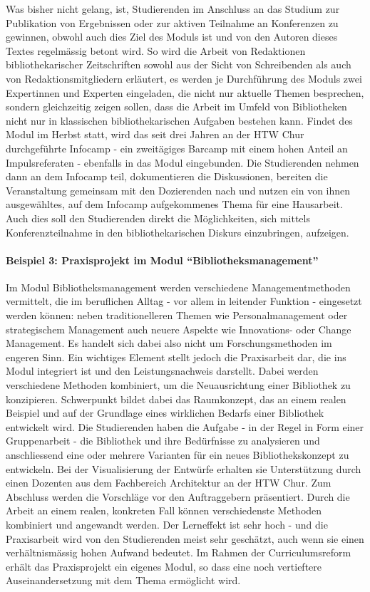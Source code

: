 \documentclass[a4paper,
fontsize=11pt,
oneside,
numbers=noperiodatend,
parskip=half-,
bibliography=totoc,
final
]{scrartcl}
\begin{document}
Was bisher nicht gelang, ist, Studierenden im Anschluss an das Studium
zur Publikation von Ergebnissen oder zur aktiven Teilnahme an
Konferenzen zu gewinnen, obwohl auch dies Ziel des Moduls ist und von
den Autoren dieses Textes regelmässig betont wird. So wird die Arbeit
von Redaktionen bibliothekarischer Zeitschriften sowohl aus der Sicht
von Schreibenden als auch von Redaktionsmitgliedern erläutert, es werden
je Durchführung des Moduls zwei Expertinnen und Experten eingeladen, die
nicht nur aktuelle Themen besprechen, sondern gleichzeitig zeigen
sollen, dass die Arbeit im Umfeld von Bibliotheken nicht nur in
klassischen bibliothekarischen Aufgaben bestehen kann. Findet des Modul
im Herbst statt, wird das seit drei Jahren an der HTW Chur durchgeführte
Infocamp - ein zweitägiges Barcamp mit einem hohen Anteil an
Impulsreferaten - ebenfalls in das Modul eingebunden. Die Studierenden
nehmen dann an dem Infocamp teil, dokumentieren die Diskussionen,
bereiten die Veranstaltung gemeinsam mit den Dozierenden nach und nutzen
ein von ihnen ausgewähltes, auf dem Infocamp aufgekommenes Thema für
eine Hausarbeit. Auch dies soll den Studierenden direkt die
Möglichkeiten, sich mittels Konferenzteilnahme in den bibliothekarischen
Diskurs einzubringen, aufzeigen.

\paragraph{Beispiel 3: Praxisprojekt im Modul
\enquote{Bibliotheksmanagement}}\label{beispiel-3-praxisprojekt-im-modul-bibliotheksmanagement}

Im Modul Bibliotheksmanagement werden verschiedene Managementmethoden
vermittelt, die im beruflichen Alltag - vor allem in leitender Funktion
- eingesetzt werden können: neben traditionelleren Themen wie
Personalmanagement oder strategischem Management auch neuere Aspekte wie
Innovations- oder Change Management. Es handelt sich dabei also nicht um
Forschungsmethoden im engeren Sinn. Ein wichtiges Element stellt jedoch
die Praxisarbeit dar, die ins Modul integriert ist und den
Leistungsnachweis darstellt. Dabei werden verschiedene Methoden
kombiniert, um die Neuausrichtung einer Bibliothek zu konzipieren.
Schwerpunkt bildet dabei das Raumkonzept, das an einem realen Beispiel
und auf der Grundlage eines wirklichen Bedarfs einer Bibliothek
entwickelt wird. Die Studierenden haben die Aufgabe - in der Regel in
Form einer Gruppenarbeit - die Bibliothek und ihre Bedürfnisse zu
analysieren und anschliessend eine oder mehrere Varianten für ein neues
Bibliothekskonzept zu entwickeln. Bei der Visualisierung der Entwürfe
erhalten sie Unterstützung durch einen Dozenten aus dem Fachbereich
Architektur an der HTW Chur. Zum Abschluss werden die Vorschläge vor den
Auftraggebern präsentiert. Durch die Arbeit an einem realen, konkreten
Fall können verschiedenste Methoden kombiniert und angewandt werden. Der
Lerneffekt ist sehr hoch - und die Praxisarbeit wird von den
Studierenden meist sehr geschätzt, auch wenn sie einen verhältnismässig
hohen Aufwand bedeutet. Im Rahmen der Curriculumsreform erhält das
Praxisprojekt ein eigenes Modul, so dass eine noch vertieftere
Auseinandersetzung mit dem Thema ermöglicht wird.
\end{document}
